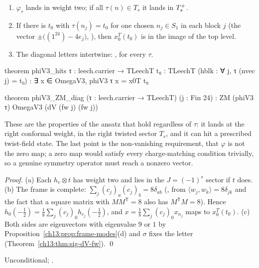 \begin{proposition}\label{ch13:prop:phiV3-basic}
\begin{enumerate}[label=(\alph*)]
\item $\varphi_\tau$ lands in weight two; if all $\tau(n)\in T_s$ it lands in $T_{s}^{+}$.
\item If there is $t_0$ with $\tau(n_j)=t_0$ for one chosen $n_j\in S_1$ in each block $j$ (the vector
  $\pm\bigl((1^{24})-4e_j\bigr)$, ), then $x_0^T(t_0)$ is in the image of the top level.
\item The diagonal letters intertwine: , for every $\tau$.
\end{enumerate}
\end{proposition}
\begin{leancode}
theorem phiV3_hits {τ : leech.carrier → TLeechT} {t₀ : TLeechT} (hblk : ∀ j, τ (nvec j) = t₀) :
    ∃ x ∈ OmegaV3, phiV3 τ x = x0T t₀

theorem phiV3_ZM_diag (τ : leech.carrier → TLeechT) (j : Fin 24) :
    ZM (phiV3 τ) OmegaV3 (dV (fw j) (fw j))
\end{leancode}
\begin{physics}
These are the properties of the ansatz that hold regardless of $\tau$: it lands at the right conformal weight, in the right twisted sector $T_s$, and it can hit a prescribed twist-field state. The last point is the non-vanishing requirement, that $\varphi$ is not the zero map; a zero map would satisfy every charge-matching condition trivially, so a genuine symmetry operator must reach a nonzero vector.
\end{physics}
\noindent\emph{Proof.} (a) Each $h_v\otimes t$ has weight two and lies in the $J=(-1)^s$ sector if $t$
does. (b) The frame is complete: $\sum_j(c_j)_a(c_j)_b=8\delta_{ab}$ (, from
$\langle w_j,w_k\rangle=8\delta_{jk}$ and the fact that a square matrix with $MM^{\mathsf T}=8$ also has
$M^{\mathsf T}M=8$). Hence $h_0(-\tfrac12)=\tfrac18\sum_j(c_j)_0h_{c_j}(-\tfrac12)$, and
$x=\tfrac18\sum_j(c_j)_0x_{n_j}$ maps to $x_0^T(t_0)$. (c) Both sides are eigenvectors with eigenvalue $9$
or $1$ by Proposition~\ref{ch13:prop:frame-modes}(d) and $\sigma$ fixes the letter
(Theorem~\ref{ch13:thm:sig-dV-fw}). \qed
\begin{status}Unconditional; .\end{status}

